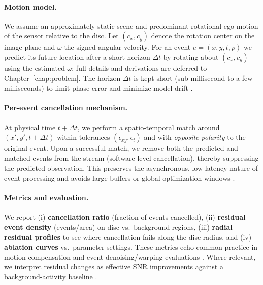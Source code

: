 \paragraph{Motion model.}
We assume an approximately static scene and predominant rotational ego-motion of the sensor relative to the disc. Let $(c_x,c_y)$ denote the rotation center on the image plane and $\omega$ the signed angular velocity. For an event $e=(x,y,t,p)$ we predict its future location after a short horizon $\Delta t$ by rotating about $(c_x,c_y)$ using the estimated $\omega$; full details and derivations are deferred to Chapter~\ref{chap:problem}. The horizon $\Delta t$ is kept short (sub-millisecond to a few milliseconds) to limit phase error and minimize model drift \cite{Gallego2017Angular,Gallego2018CMax}.

\paragraph{Per-event cancellation mechanism.}
At physical time $t+\Delta t$, we perform a spatio-temporal match around $(x',y',t+\Delta t)$ within tolerances $(\epsilon_{xy},\epsilon_{t})$ and with \emph{opposite polarity} to the original event. Upon a successful match, we remove both the predicted and matched events from the stream (software-level cancellation), thereby suppressing the predicted observation. This preserves the asynchronous, low-latency nature of event processing and avoids large buffers or global optimization windows \cite{Bardow2016SOFIE,Gallego2018CMax}.

\paragraph{Metrics and evaluation.}
We report (i) \textbf{cancellation ratio} (fraction of events cancelled), (ii) \textbf{residual event density} (events/area) on disc vs.\ background regions, (iii) \textbf{radial residual profiles} to see where cancellation fails along the disc radius, and (iv) \textbf{ablation curves} vs.\ parameter settings. These metrics echo common practice in motion compensation and event denoising/warping evaluations \cite{Bardow2016SOFIE,Gallego2018CMax,Xu2020TCI}. Where relevant, we interpret residual changes as effective SNR improvements against a background-activity baseline \cite{Gallego2020Survey}.

